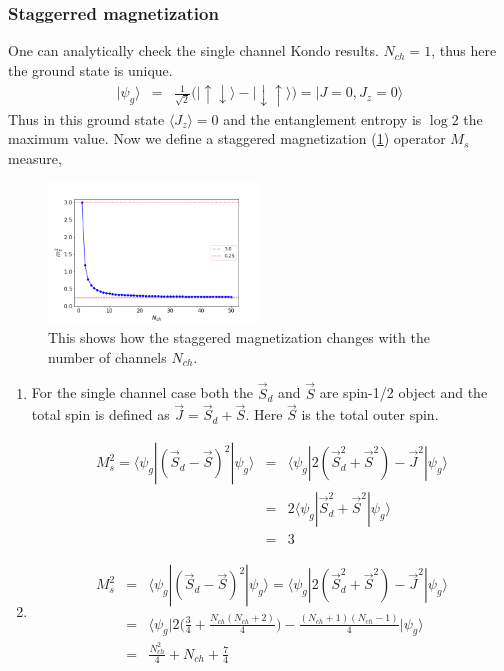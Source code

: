 \documentclass[reprint,prb,superscriptaddress]{revtex4-2}
\begin{document}
\subsubsection{Staggerred magnetization}
One can analytically check the single channel Kondo results. $N_{ch}=1$, thus here the ground state is unique.
\begin{eqnarray}
|\psi_g\rangle &=& \frac{1}{\sqrt{2}} \bigg(|\uparrow\downarrow\rangle-|\downarrow\uparrow\rangle\bigg)= |J=0,J_z=0\rangle
\end{eqnarray}
Thus in this ground state $\langle J_z \rangle=0$ and the  entanglement entropy is $\log 2$ the maximum value. Now we define a staggered magnetization (\ref{fig:st_mag}) operator $M_s$ measure,


\begin{figure}
\includegraphics[width=0.5\textwidth]{plt/Staggered_mag_50.png}
\caption{This shows how the staggered magnetization changes with the number of channels $N_{ch}$.}
\label{fig:st_mag}
\end{figure}

\begin{enumerate}
\item For the single channel case both the $\vec{S}_d$ and $\vec{S}$ are spin-1/2 object and the total spin is defined as $\vec{J}=\vec{S}_d+\vec{S}$. Here $\vec{S}$ is the total outer spin.

\begin{eqnarray}
M_s^2 = \langle \psi_g | (\vec{S}_d - \vec{S})^2 |\psi_g\rangle &=& \langle \psi_g | 2(\vec{S}_d^2 + \vec{S}^2)-\vec{J}^2 |\psi_g\rangle \nonumber\\
&=& 2 \langle \psi_g | \vec{S}_d^2 +\vec{S}^2 |\psi_g\rangle \nonumber\\
&=& 3
\end{eqnarray}

\item \begin{eqnarray}
M_s^2 &=& \langle \psi_g | (\vec{S}_d - \vec{S})^2 |\psi_g\rangle = \langle \psi_g | 2(\vec{S}_d^2 + \vec{S}^2)-\vec{J}^2 |\psi_g\rangle \nonumber\\
&=&  \bigg\langle \psi_g \bigg| 2\bigg(\frac{3}{4}+ \frac{N_{ch}(N_{ch}+2)}{4}\bigg)- \frac{(N_{ch}+1)(N_{ch}-1)}{4} \bigg|\psi_g \bigg\rangle \nonumber\\
&=& \frac{N_{ch}^2}{4}+N_{ch}+\frac{7}{4}
\end{eqnarray}

\end{enumerate}
\end{document}
